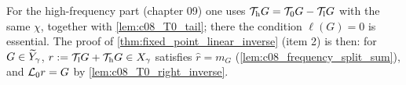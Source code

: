 \begin{remark}
  For the high-frequency part (chapter 09) one uses $\mathcal{T}_{\rm h}G=\mathcal{T}_0G-\mathcal{T}_{\rm l}G$ with the same $\chi$, together
  with \cref{lem:c08_T0_tail}; there the condition $\ell(G)=0$ is essential. The proof of \cref{thm:fixed_point_linear_inverse}
  (item 2) is then: for $G\in\widetilde{Y}_\gamma$, $r:=\mathcal{T}_{\rm l}G+\mathcal{T}_{\rm h}G\in X_\gamma$ satisfies $\widehat r=m_G$
  (\cref{lem:c08_frequency_split_sum}), and $\mathcal{L}_0r=G$ by \cref{lem:c08_T0_right_inverse}.
\end{remark}
